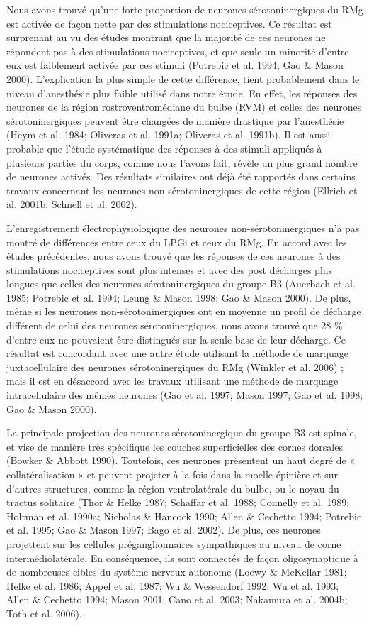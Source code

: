 \documentclass[a4paper,12pt,twoside]{report}
\begin{document}
Nous avons trouvé qu’une forte proportion de neurones sérotoninergiques du RMg est activée de façon nette par des stimulations nociceptives. Ce résultat est surprenant au vu des études montrant que la majorité de ces neurones ne répondent pas à des stimulations nociceptives, et que seule un minorité d’entre eux est faiblement activée par ces stimuli (Potrebic et al. 1994; Gao \& Mason 2000). L’explication la plus simple de cette différence, tient probablement dans le niveau d’anesthésie plus faible utilisé dans notre étude. En effet, les réponses des neurones de la région rostroventromédiane du bulbe (RVM) et celles des neurones sérotoninergiques peuvent être changées de manière drastique par l’anesthésie (Heym et al. 1984; Oliveras et al. 1991a; Oliveras et al. 1991b). Il est aussi probable que l’étude systématique des réponses à des stimuli appliqués à plusieurs parties du corps, comme nous l’avons fait, révèle un plus grand nombre de neurones activés. Des résultats similaires ont déjà été rapportés dans certains travaux concernant les neurones non-sérotoninergiques de cette région (Ellrich et al. 2001b; Schnell et al. 2002). 

L’enregistrement électrophysiologique des neurones non-sérotoninergiques n’a pas montré de différences entre ceux du LPGi et ceux du RMg. En accord avec les études précédentes, nous avons trouvé que les réponses de ces neurones à des stimulations nociceptives sont plus intenses et avec des post décharges plus longues que celles des neurones sérotoninergiques du groupe B3 (Auerbach et al. 1985; Potrebic et al. 1994; Leung \& Mason 1998; Gao \& Mason 2000). De plus, même si les neurones non-sérotoninergiques ont en moyenne un profil de décharge différent de celui des neurones sérotoninergiques, nous avons trouvé que 28 \% d’entre eux ne pouvaient être distingués sur la seule base de leur décharge. Ce résultat est concordant avec une autre étude utilisant la méthode de marquage juxtacellulaire des neurones sérotoninergiques du RMg (Winkler et al. 2006) ; mais il est en désaccord avec les travaux utilisant une méthode de marquage intracellulaire des mêmes neurones (Gao et al. 1997; Mason 1997; Gao et al. 1998; Gao \& Mason 2000). 

La principale projection des neurones sérotoninergique du groupe B3 est spinale, et vise de manière très spécifique les couches superficielles des cornes dorsales (Bowker \& Abbott 1990). Toutefois, ces neurones présentent un haut degré de « collatéralisation » et peuvent projeter à la fois dans la moelle épinière et sur d’autres structures, comme la région ventrolatérale du bulbe, ou le noyau du tractus solitaire (Thor \& Helke 1987; Schaffar et al. 1988; Connelly et al. 1989; Holtman et al. 1990a; Nicholas \& Hancock 1990; Allen \& Cechetto 1994; Potrebic et al. 1995; Gao \& Mason 1997; Bago et al. 2002). De plus, ces neurones projettent sur les cellules préganglionnaires sympathiques au niveau de corne intermédiolatérale. En conséquence, ils sont connectés de façon oligosynaptique à de nombreuses cibles du système nerveux autonome (Loewy \& McKellar 1981; Helke et al. 1986; Appel et al. 1987; Wu \& Wessendorf 1992; Wu et al. 1993; Allen \& Cechetto 1994; Mason 2001; Cano et al. 2003; Nakamura et al. 2004b; Toth et al. 2006). 
\end{document}
